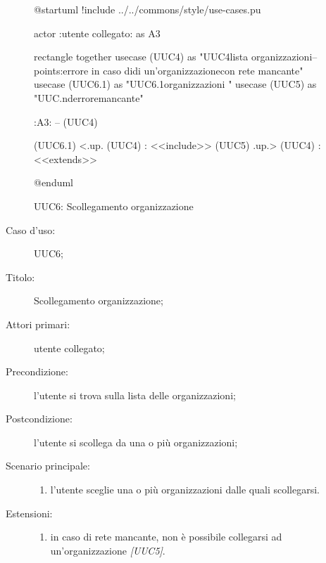 \documentclass[../../../analisi-dei-requisiti.tex]{subfiles}
\begin{document}
\begin{figure}[H]
  \centering
  \begin{plantuml}
  @startuml
  !include ../../commons/style/use-cases.pu

  actor :utente collegato: as A3

  rectangle {
    together {
      usecase (UUC4) as "UUC4\nRecupero lista organizzazioni\n--\nExtension points:\nVisualizzazione errore in caso di\nselezionamento di un'organizzazione\n con rete mancante"
      usecase (UUC6.1) as "UUC6.1\nFiltra organizzazioni \ncollegato"
      usecase (UUC5) as "UUC.nd\nVisualizzazione errore\nrete mancante"
    }
  }

  :A3: -- (UUC4)

  (UUC6.1) <.up. (UUC4) : <<include>>
  (UUC5) .up.> (UUC4) : <<extends>>

  @enduml
  \end{plantuml}
  \caption{UUC6: Scollegamento organizzazione}%
  \label{fig:uuc5}
\end{figure}

\begin{description}
  \item[Caso d’uso:] UUC6;
  \item[Titolo:] Scollegamento organizzazione;
  \item[Attori primari:] utente collegato;
  \item[Precondizione:] l'utente si trova sulla lista delle organizzazioni;
  \item[Postcondizione:] l'utente si scollega da una o più organizzazioni;
  \item[Scenario principale:]
        \begin{enumerate}
          \item l'utente sceglie una o più organizzazioni dalle quali scollegarsi.
        \end{enumerate}
  \item[Estensioni:]
        \begin{enumerate}
          \item in caso di rete mancante, non è possibile collegarsi ad un'organizzazione \emph{[UUC5]}.
        \end{enumerate}
\end{description}
\end{document}
